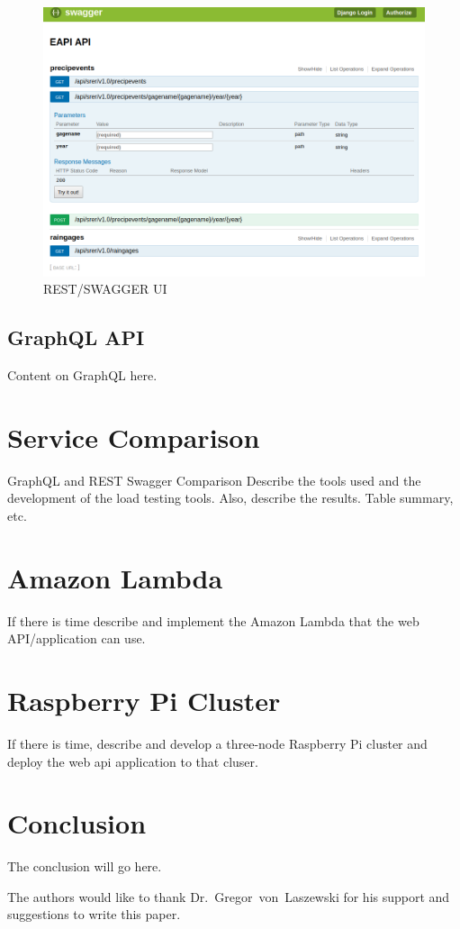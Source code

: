 \begin{figure}[htb]
  \centering\includegraphics[width=\columnwidth]{./images/rest_swagger_ui.png}
  \caption{REST/SWAGGER UI \cite{hid505SrerWebSite2018}}\label{f:rest_swagger_ui}
\end{figure}

\subsection{GraphQL API}
Content on GraphQL here.

\section{Service Comparison}
GraphQL and REST Swagger Comparison
Describe the tools used and the development of the load testing tools.  
Also, describe the results.  Table summary, etc.

\section{Amazon Lambda}
If there is time describe and implement the Amazon Lambda that the web 
API/application can use.

\section{Raspberry Pi Cluster}
If there is time, describe and develop a three-node Raspberry Pi cluster and 
deploy the web api application to that cluser.

\section{Conclusion}
The conclusion will go here.

\begin{acks}
The authors would like to thank Dr.~Gregor~von~Laszewski for his support 
and suggestions to write this paper.
\end{acks}


 

